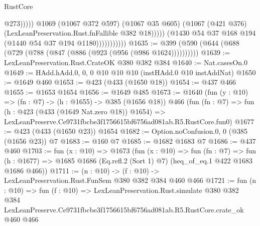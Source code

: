 \begin{lexlean}{RustCore}
\begin{coremodule}
                                      @273)))))
                            @1069
                            (@1067 @372 @597)
                            (@1067 @35 @605)
                            (@1067 (@421 @376) (LexLeanPreservation.Rust.fnFallible @382 @18)))))
                      (@1430 @54 @37 @168 @194 (@1440 @54 @37 @194 @1180)))))))))))
@1635 := @399 (@590 (@644 (@688 (@729 (@788 (@847 (@886 (@923 (@956 (@986 @1624))))))))))
@1639 := LexLeanPreservation.Rust.CrateOK @380 @382 @384
@1640 := Nat.casesOn.{0}
@1649 := HAdd.hAdd.{0, 0, 0} @10 @10 @10 (instHAdd.{0} @10 instAddNat)
@1650 := @1649 @460
@1653 := @423 (@433 (@1650 @18))
@1654 := @437 @466
@1655 := @1653 @1654
@1656 := @1649 @485
@1673 := @1640
    (fun (y : @10) => (fn : @7) -> (h : @1655) -> @385 (@1656 @18))
    @466
    (fun (fn : @7) =>
    fun (h : @423 (@433 (@1649 Nat.zero @18)) @1654) =>
    LexLeanPreserve.Ce9731fbcbe3f1756615bf6756ad081ab.R5.RustCore.fun0)
@1677 := @423 (@433 (@1650 @23)) @1654
@1682 := Option.noConfusion.{0, 0} (@385 (@1656 @23)) @7
@1683 := @160 @7
@1685 := @1682 @1683 @7
@1686 := @437 @460
@1703 := fun (x : @10) =>
  @1673
    (fun (x : @10) =>
    fun (fn : @7) =>
    fun (h : @1677) => @1685 @1686 (Eq.refl.{2} (Sort 1) @7) (heq_of_eq.{1} @422 @1683 @1686 @466))
@1711 := (n : @10) -> (f : @10) -> LexLeanPreservation.Rust.FunSem @380 @382 @384 @460 @466
@1721 := fun (n : @10) =>
  fun (f : @10) =>
  LexLeanPreservation.Rust.simulate
    @380
    @382
    @384
    LexLeanPreserve.Ce9731fbcbe3f1756615bf6756ad081ab.R5.RustCore.crate_ok
    @460
    @466
\end{coremodule}
\end{lexlean}
